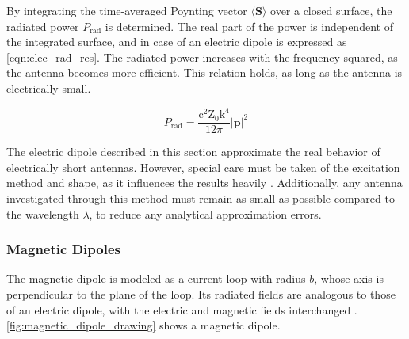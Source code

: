 By integrating the time-averaged Poynting vector $ \langle \mathbf{S} \rangle$ over a closed surface, the radiated power $P_{\mathrm{rad}}$ is determined. The real part of the power is independent of the integrated surface, and in case of an electric dipole is expressed as \autoref{eqn:elec_rad_res}. The radiated power increases with the frequency squared, as the antenna becomes more efficient. This relation holds, as long as the antenna is electrically small.

\begin{equation}
    P_{\mathrm{rad}} = \frac{\mathrm{c}^2\mathrm{Z_0}\mathrm{k}^4}{12\pi}|\mathbf{p}|^2
    \label{eqn:elec_rad_res}
\end{equation}

The electric dipole described in this section approximate the real behavior of electrically short antennas. However, special care must be taken of the excitation method and shape, as it influences the results heavily \cite{Jackson}. Additionally, any antenna investigated through this method must remain as small as possible compared to the wavelength $\lambda$, to reduce any analytical approximation errors. 




\subsubsection{Magnetic Dipoles}

The magnetic dipole is modeled as a current loop with radius $b$, whose axis is perpendicular to the plane of the loop. Its radiated fields are analogous to those of an electric dipole, with the electric and magnetic fields interchanged \cite{Balanis_1997}. \autoref{fig:magnetic_dipole_drawing} shows a magnetic dipole.

